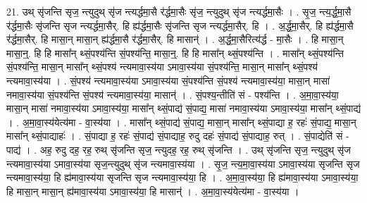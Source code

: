 \documentclass[17pt]{extarticle}
\begin{document}
21. उथ् सृ॑जन्ति सृज॒ न्त्युदुथ् सृ॑ज न्त्यर्द्धमा॒सै र॑र्द्धमा॒सैः सृ॑ज॒ न्त्युदुथ् सृ॑ज न्त्यर्द्धमा॒सैः । . सृ॒ज॒ न्त्य॒र्द्ध॒मा॒सै र॑र्द्धमा॒सैः सृ॑जन्ति सृज न्त्यर्द्धमा॒सैर्. हि ह्य॑र्द्धमा॒सैः सृ॑जन्ति सृज न्त्यर्द्धमा॒सैर्. हि । . अ॒र्द्ध॒मा॒सैर्. हि ह्य॑र्द्धमा॒सै र॑र्द्धमा॒सैर्. हि मासा॒न् मासा॒न् ह्य॑र्द्धमा॒सै र॑र्द्धमा॒सैर्. हि मासान्॑ । . अ॒र्द्ध॒मा॒सैरित्य॑र्द्ध - मा॒सैः । . हि मासा॒न् मासा॒न्॒. हि हि मासा᳚न् थ्सं॒पश्य॑न्ति सं॒पश्य॑न्ति॒ मासा॒न्॒. हि हि मासा᳚न् थ्सं॒पश्य॑न्ति । . मासा᳚न् थ्सं॒पश्य॑न्ति सं॒पश्य॑न्ति॒ मासा॒न् मासा᳚न् थ्सं॒पश्य॑ न्त्यमावा॒स्य॑या ऽमावा॒स्य॑या सं॒पश्य॑न्ति॒ मासा॒न् मासा᳚न् थ्सं॒पश्य॑ न्त्यमावा॒स्य॑या । . सं॒पश्य॑ न्त्यमावा॒स्य॑या ऽमावा॒स्य॑या सं॒पश्य॑न्ति सं॒पश्य॑ न्त्यमावा॒स्य॑या॒ मासा॒न् मासा॑ नमावा॒स्य॑या सं॒पश्य॑न्ति सं॒पश्य॑ न्त्यमावा॒स्य॑या॒ मासान्॑ । . सं॒पश्य॒न्तीति॑ सं - पश्य॑न्ति । . अ॒मा॒वा॒स्य॑या॒ मासा॒न् मासा॑ नमावा॒स्य॑या ऽमावा॒स्य॑या॒ मासा᳚न् थ्सं॒पाद्य॑ सं॒पाद्य॒ मासा॑ नमावा॒स्य॑या ऽमावा॒स्य॑या॒ मासा᳚न् थ्सं॒पाद्य॑ । . अ॒मा॒वा॒स्य॑येत्य॑मा - वा॒स्य॑या । . मासा᳚न् थ्सं॒पाद्य॑ सं॒पाद्य॒ मासा॒न् मासा᳚न् थ्सं॒पाद्या ह॒ रहः॑ सं॒पाद्य॒ मासा॒न् मासा᳚न् थ्सं॒पाद्याहः॑ । . सं॒पाद्या ह॒ रहः॑ सं॒पाद्य॑ सं॒पाद्याह॒ रुदु दहः॑ सं॒पाद्य॑ सं॒पाद्याह॒ रुत् । . सं॒पाद्येति॑ सं - पाद्य॑ । . अह॒ रुदु दह॒ रह॒ रुथ् सृ॑जन्ति सृज॒ न्त्युदह॒ रह॒ रुथ् सृ॑जन्ति । . उथ् सृ॑जन्ति सृज॒ न्त्युदुथ् सृ॑ज न्त्यमावा॒स्य॑या ऽमावा॒स्य॑या सृज॒न्त्युदुथ् सृ॑ज न्त्यमावा॒स्य॑या । . सृ॒ज॒ न्त्य॒मा॒वा॒स्य॑या ऽमावा॒स्य॑या सृजन्ति सृज न्त्यमावा॒स्य॑या॒ हि ह्य॑मावा॒स्य॑या सृजन्ति सृज न्त्यमावा॒स्य॑या॒ हि । . अ॒मा॒वा॒स्य॑या॒ हि ह्य॑मावा॒स्य॑या ऽमावा॒स्य॑या॒ हि मासा॒न् मासा॒न् ह्य॑मावा॒स्य॑या ऽमावा॒स्य॑या॒ हि मासान्॑ । . अ॒मा॒वा॒स्य॑येत्य॑मा - वा॒स्य॑या । \newline
\end{document}

